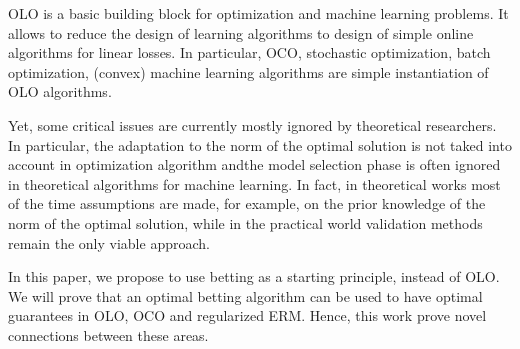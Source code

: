 \ac{OLO} is a basic building block for optimization and machine learning problems. It allows to reduce the design of learning algorithms to design of simple online algorithms for linear losses.
In particular, \ac{OCO}, stochastic optimization, batch optimization, (convex) machine learning algorithms are simple instantiation of \ac{OLO} algorithms.

Yet, some critical issues are currently mostly ignored by theoretical researchers.
In particular, the adaptation to the norm of the optimal solution is not taked into account in optimization algorithm andthe model selection phase is often ignored in theoretical algorithms for machine learning.
In fact, in theoretical works most of the time assumptions are made, for example, on the prior knowledge of the norm of the optimal solution, while in the practical world validation methods remain the only viable approach.

In this paper, we propose to use betting as a starting principle, instead of \ac{OLO}. We will prove that an optimal betting algorithm can be used to have optimal guarantees in \ac{OLO}, \ac{OCO} and regularized ERM. Hence, this work prove novel connections between these areas.

